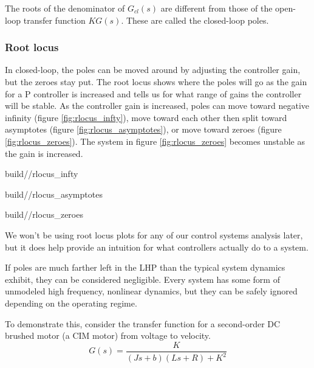 The roots of the denominator of $G_{cl}(s)$ are different from those of the
open-loop transfer function $KG(s)$. These are called the closed-loop poles.

\subsubsection{Root locus}
\label{subsubsec:root_locus}

In closed-loop, the poles can be moved around by adjusting the controller gain,
but the zeroes stay put. The root locus shows where the poles will go as the
gain for a P controller is increased and tells us for what range of gains the
controller will be stable. As the controller gain is increased, poles can move
toward negative infinity (figure \ref{fig:rlocus_infty}), move toward each other
then split toward asymptotes (figure \ref{fig:rlocus_asymptotes}), or move
toward zeroes (figure \ref{fig:rlocus_zeroes}). The \gls{system} in figure
\ref{fig:rlocus_zeroes} becomes unstable as the gain is increased.
\begin{bookfigure}
  \begin{minisvg}{2}{build/\sectionpath/rlocus_infty}
    \caption{Root locus showing pole moving toward negative infinity}
    \label{fig:rlocus_infty}
  \end{minisvg}
  \hfill
  \begin{minisvg}{2}{build/\sectionpath/rlocus_asymptotes}
    \caption{Root locus showing poles moving toward asymptotes}
    \label{fig:rlocus_asymptotes}
  \end{minisvg}
  \hfill
  \begin{minisvg}{2}{build/\sectionpath/rlocus_zeroes}
    \caption{Root locus of equation \eqref{eq:transfer_func} showing poles
      moving toward zeroes.}
    \label{fig:rlocus_zeroes}
  \end{minisvg}
\end{bookfigure}

We won't be using root locus plots for any of our control systems analysis
later, but it does help provide an intuition for what \glspl{controller}
actually do to a \gls{system}.

If poles are much farther left in the LHP than the typical \gls{system} dynamics
exhibit, they can be considered negligible. Every \gls{system} has some form of
unmodeled high frequency, nonlinear dynamics, but they can be safely ignored
depending on the operating regime.

To demonstrate this, consider the transfer function for a second-order DC
brushed motor (a CIM motor) from voltage to velocity.
\begin{equation*}
  G(s) = \frac{K}{(Js + b)(Ls + R) + K^2}
\end{equation*}


